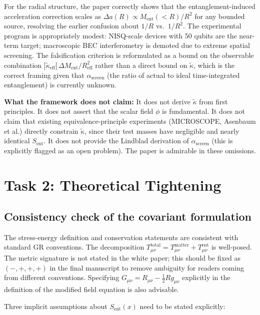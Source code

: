\documentclass[12pt,letterpaper]{article}
\theoremstyle{plain}
\theoremstyle{definition}
\theoremstyle{remark}
\newcommand{\kt}{\tilde{\kappa}}
\newcommand{\kteff}{\tilde{\kappa}_{\mathrm{eff}}}
\newcommand{\Sent}{S_{\mathrm{ent}}}
\newcommand{\Ment}{M_{\mathrm{ent}}}
\newcommand{\asc}{\alpha_{\mathrm{screen}}}
\begin{document}
For the radial structure, the paper correctly shows that the entanglement-induced acceleration correction scales as $\Delta a(R) \propto \Ment(<\!R)/R^2$ for any bounded source, resolving the earlier confusion about $1/R$ vs.\ $1/R^2$. The experimental program is appropriately modest: NISQ-scale devices with 50 qubits are the near-term target; macroscopic BEC interferometry is demoted due to extreme spatial screening. The falsification criterion is reformulated as a bound on the observable combination $|\kteff|\,\Delta\Ment/R_{\mathrm{eff}}^2$ rather than a direct bound on $\kt$, which is the correct framing given that $\asc$ (the ratio of actual to ideal time-integrated entanglement) is currently unknown.

\textbf{What the framework does not claim:} It does not derive $\kt$ from first principles. It does not assert that the scalar field $\phi$ is fundamental. It does not claim that existing equivalence-principle experiments (MICROSCOPE, Asenbaum et al.) directly constrain $\kt$, since their test masses have negligible and nearly identical $\Sent$. It does not provide the Lindblad derivation of $\asc$ (this is explicitly flagged as an open problem). The paper is admirable in these omissions.

\section{Task 2: Theoretical Tightening}
\label{sec:task2}

\subsection{Consistency check of the covariant formulation}

The stress-energy definition and conservation statements are consistent with standard GR conventions. The decomposition $T^{\mathrm{total}}_{\mu\nu} = T^{\mathrm{matter}}_{\mu\nu} + T^{\mathrm{ent}}_{\mu\nu}$ is well-posed. The metric signature is not stated in the white paper; this should be fixed as $(-,+,+,+)$ in the final manuscript to remove ambiguity for readers coming from different conventions. Specifying $G_{\mu\nu} = R_{\mu\nu} - \tfrac{1}{2}Rg_{\mu\nu}$ explicitly in the definition of the modified field equation is also advisable.

Three implicit assumptions about $\Sent(x)$ need to be stated explicitly:
\end{document}
